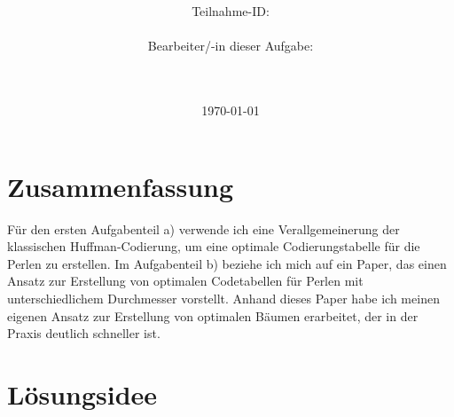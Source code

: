 \documentclass[a4paper,10pt,ngerman]{scrartcl}
\title{\textbf{\Huge\Aufgabe}}
\author{\LARGE Teilnahme-ID: \LARGE \TeilnahmeId \\\\
\LARGE Bearbeiter/-in dieser Aufgabe: \\
\LARGE \Name\\\\}
\date{\LARGE\today}
\begin{document}
    \maketitle
    \tableofcontents

    \section*{Zusammenfassung}
    Für den ersten Aufgabenteil a) verwende ich eine Verallgemeinerung der klassischen Huffman-Codierung, um eine optimale Codierungstabelle für die Perlen zu erstellen.
    Im Aufgabenteil b) beziehe ich mich auf ein Paper, das einen Ansatz zur Erstellung von optimalen Codetabellen für Perlen mit unterschiedlichem Durchmesser vorstellt.
    Anhand dieses Paper habe ich meinen eigenen Ansatz zur Erstellung von optimalen Bäumen erarbeitet, der in der Praxis deutlich schneller ist.

    \clearpage


    \section{Lösungsidee}
\end{document}
